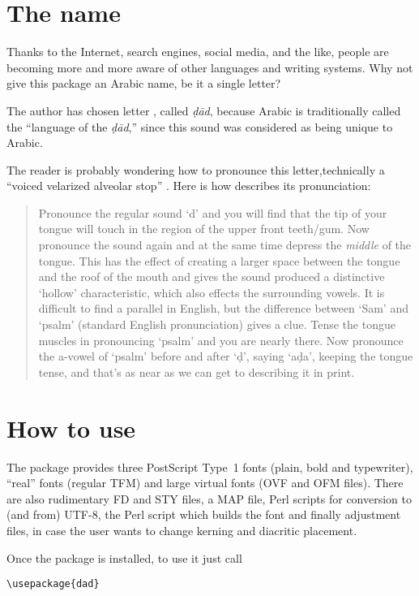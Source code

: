 \documentclass[11pt,a4paper]{article}
\begin{document}
\section{The name}

Thanks to the Internet, search engines, social media, and the like, people are becoming more and more aware of other languages and writing systems. Why not give this package an Arabic name, be it a single letter?

The author has chosen letter , called \emph{\d{d}\=ad}, because Arabic is traditionally called the ``language of the \emph{\d{d}\=ad},'' since this sound was considered as being unique to Arabic.

The reader is probably wondering how to pronounce this letter,technically a ``voiced velarized alveolar stop'' \cite[p.~16]{ryding2014}. Here is how \cite[p.~10]{learn2} describes its pronunciation:

\begin{quotation}
Pronounce the regular sound `d' and you will find that the tip of your tongue will touch in the region of the upper front teeth/gum. Now pronounce the sound again and at the same time depress the \emph{middle} of the tongue. This has the effect of creating a larger space between the tongue and the roof of the mouth and gives the sound produced a distinctive `hollow' characteristic, which also effects the surrounding vowels. It is difficult to find a parallel in English, but the difference between `Sam' and `psalm' (standard English pronunciation) gives a clue. Tense the tongue muscles in pronouncing `psalm' and you are nearly there. Now pronounce the a-vowel of `psalm' before and after `\d{d}', saying `a\d{d}a', keeping the tongue tense, and that's as near as we can get to describing it in print.
\end{quotation}

\section{How to use }

The package provides three PostScript Type~1 fonts (plain,  bold and typewriter), ``real'' fonts (regular TFM) and large virtual fonts (OVF and OFM files). There are also rudimentary FD and STY files, a MAP file, Perl scripts for conversion to (and from) UTF-8, the Perl script which builds the font and finally adjustment files, in case the user wants to change kerning and diacritic placement.

Once the package is installed, to use it just call
\begin{verbatim}
\usepackage{dad}
\end{verbatim}
\end{document}
